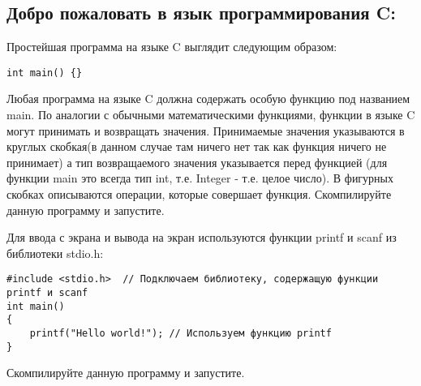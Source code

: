 \documentclass{article}
\begin{document}



\subsection*{Добро пожаловать в язык программирования C:}
Простейшая программа на языке C выглядит следующим образом:
\begin{lstlisting}
int main() {}
\end{lstlisting}
Любая программа на языке C должна содержать особую функцию под названием main. По аналогии с обычными математическими функциями, функции в языке C могут принимать и возвращать значения. Принимаемые значения указываются в круглых скобкая(в данном случае там ничего нет так как функция ничего не принимает) а тип возвращаемого значения указывается перед функцией (для функции main это всегда тип int, т.е. Integer - т.е. целое число). В фигурных скобках описываются операции, которые совершает функция. Скомпилируйте данную программу и запустите.


Для ввода с экрана и вывода на экран используются функции printf и scanf из библиотеки stdio.h:
\begin{lstlisting}
#include <stdio.h>  // Подключаем библиотеку, содержащую функции printf и scanf
int main() 
{
    printf("Hello world!"); // Используем функцию printf
}
\end{lstlisting}
Скомпилируйте данную программу и запустите. \\
\end{document}
